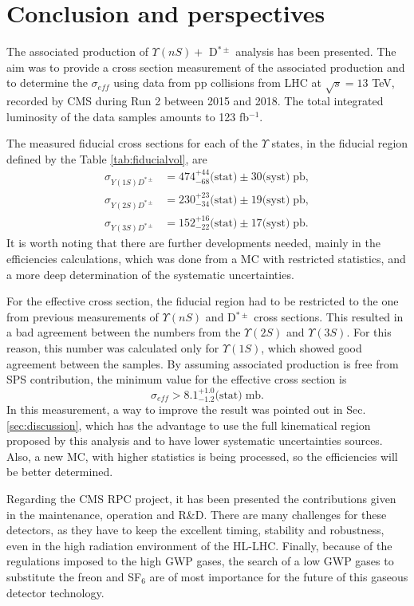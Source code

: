 \chapter{Conclusion and perspectives}\label{chap:conclusion}

The associated production of $\Upsilon(nS) + $ D$^{*\pm}$ analysis has been presented. The aim was to provide a cross section measurement of the associated production and to determine the $\sigma_{eff}$ using data from pp collisions from LHC at $\sqrt{s} = 13$ TeV, recorded by CMS during Run 2 between 2015 and 2018. The total integrated luminosity of the data samples amounts to 123 fb$^{-1}$.

The measured fiducial cross sections for each of the $\Upsilon$ states, in the fiducial region defined by the Table \ref{tab:fiducialvol}, are
\begin{equation}
\begin{split}
    \sigma_{Y(1S)D^{*\pm}} &= 474^{+44}_{-68} \text{(stat)} \pm 30 \text{(syst)} \; \text{pb},\\
    \sigma_{Y(2S)D^{*\pm}} &= 230^{+23}_{-34} \text{(stat)} \pm 19 \text{(syst)} \; \text{pb},\\
    \sigma_{Y(3S)D^{*\pm}} &= 152^{+16}_{-22} \text{(stat)} \pm 17 \text{(syst)} \; \text{pb}.
\end{split} 
\end{equation}
It is worth noting that there are further developments needed, mainly in the efficiencies calculations, which was done from a MC with restricted statistics, and a more deep determination of the systematic uncertainties.

For the effective cross section, the fiducial region had to be restricted to the one from previous measurements of $\Upsilon(nS)$ and D$^{*\pm}$ cross sections. This resulted in a bad agreement between the numbers from the $\Upsilon(2S)$ and $\Upsilon(3S)$. For this reason, this number was calculated only for $\Upsilon(1S)$, which showed good agreement between the samples. By assuming associated production is free from SPS contribution, the minimum value for the effective cross section is
\begin{equation}
\sigma_{eff} > 8.1^{+1.0}_{-1.2}\text{(stat)} \; \text{mb}.
\end{equation}
In this measurement, a way to improve the result was pointed out in Sec. \ref{sec:discussion}, which has the advantage to use the full kinematical region proposed by this analysis and to have lower systematic uncertainties sources. Also, a new MC, with higher statistics is being processed, so the efficiencies will be better determined.

Regarding the CMS RPC project, it has been presented the contributions given in the maintenance, operation and R\&D. There are many challenges for these detectors, as they have to keep the excellent timing, stability and robustness, even in the high radiation environment of the HL-LHC. Finally, because of the regulations imposed to the high GWP gases, the search of a low GWP gases to substitute the freon and SF$_6$ are of most importance for the future of this gaseous detector technology.